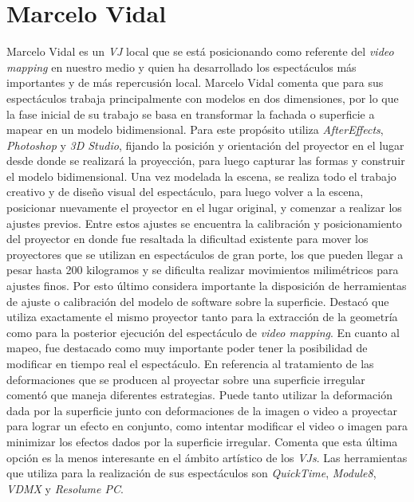 \section{Marcelo Vidal}
Marcelo Vidal\cite{Chindogu} es un \emph{VJ} local que se está posicionando como referente del \emph{video mapping} en nuestro medio y quien ha desarrollado los espectáculos más importantes y de más repercusión local.
Marcelo Vidal comenta que para sus espectáculos trabaja principalmente con modelos en dos dimensiones, por lo que la fase inicial de su trabajo se basa en transformar la fachada o superficie a mapear en un modelo bidimensional. Para este propósito utiliza \emph{AfterEffects}, \emph{Photoshop} y \emph{3D Studio}, %
fijando la posición y orientación del proyector en el lugar desde donde se realizará la proyección, para luego capturar las formas y construir el modelo bidimensional.
Una vez modelada la escena, se realiza todo el trabajo creativo y de diseño visual del espectáculo, para luego volver a la escena, posicionar nuevamente el proyector en el lugar original, y comenzar a realizar los ajustes previos. Entre estos ajustes se encuentra la calibración y posicionamiento del proyector en donde fue resaltada la dificultad existente para mover los proyectores que se utilizan en espectáculos de gran porte, los que pueden llegar a pesar hasta 200 kilogramos y se dificulta realizar movimientos milimétricos para ajustes finos. Por esto último considera importante la disposición de herramientas de ajuste o calibración del modelo de software sobre la superficie. Destacó que utiliza exactamente el mismo proyector tanto para la extracción de la geometría como para la posterior ejecución del espectáculo de \emph{video mapping}.
En cuanto al mapeo, fue destacado como muy importante poder tener la posibilidad de modificar en tiempo real el espectáculo. En referencia al tratamiento de las deformaciones que se producen al proyectar sobre una superficie irregular comentó que maneja diferentes estrategias. Puede tanto utilizar la deformación dada por la superficie junto con deformaciones de la imagen o video a proyectar para lograr un efecto en conjunto, como intentar modificar el video o imagen para minimizar los efectos dados por la superficie irregular. Comenta que esta última opción es la menos interesante en el ámbito artístico de los \emph{VJs}. Las herramientas que utiliza para la realización de sus espectáculos son \emph{QuickTime}, \emph{Module8}, \emph{VDMX} y \emph{Resolume PC}.

